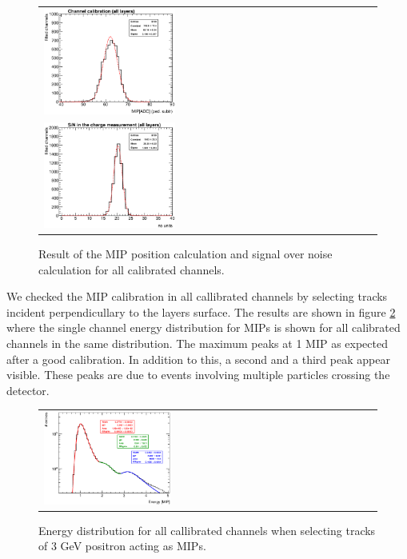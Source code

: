 \documentclass[final,3p,times,twocolumn]{elsarticle}
\begin{document}
\begin{figure}[!t]
  \centering
  \begin{tabular}{l}
    \includegraphics[width=0.4\textwidth]{../figs/MIP/MIPsummary_title.eps} \\
    \includegraphics[width=0.4\textwidth]{../figs/MIP/SNsummary_title.eps}  
  \end{tabular}
\caption{Result of the MIP position calculation and signal over noise calculation for all calibrated channels.}
\label{mipandSN}
\end{figure}

We checked the MIP 
calibration in all callibrated channels by selecting tracks
incident perpendicullary to the layers surface.
The results are shown in figure \ref{mip3peaks} where the single channel energy 
distribution for MIPs is shown for all calibrated channels in the same distribution. 
The maximum peaks at 1 MIP as expected after a good calibration.
In addition to this, a second and a third peak
appear visible. These peaks are due to
events involving multiple 
particles crossing the detector.

\begin{figure}[!t]
  \centering 
    \begin{tabular}{ll}
      \includegraphics[width=0.4\textwidth]{../figs/MIP/MIP3peaks.eps} 
    \end{tabular}
    \caption{Energy distribution for all callibrated channels when selecting tracks of 3 GeV positron acting as MIPs.}
\label{mip3peaks}
\end{figure}
\end{document}
